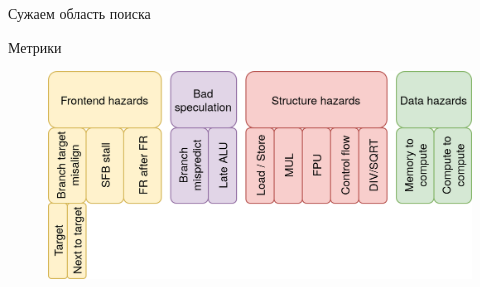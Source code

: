 \documentclass[10pt,aspectratio=169,hyperref={pdftex,unicode},xcolor=dvipsnames]{beamer}
\begin{document}
\begin{frame}[fragile]{ Сужаем область поиска }
\begin{figure}
\begin{subfigure}{0.45\textwidth}
        \end{subfigure}
        \begin{subfigure}{0.45\textwidth}
            \centering
        \end{subfigure}
    \end{figure}

\end{frame}

\begin{frame}{ Метрики }
    \begin{figure}
        \centering
        \includegraphics[height=0.8\textheight,keepaspectratio]{./images/stac_stalls.png}
    \end{figure}
\end{frame}
\end{document}
